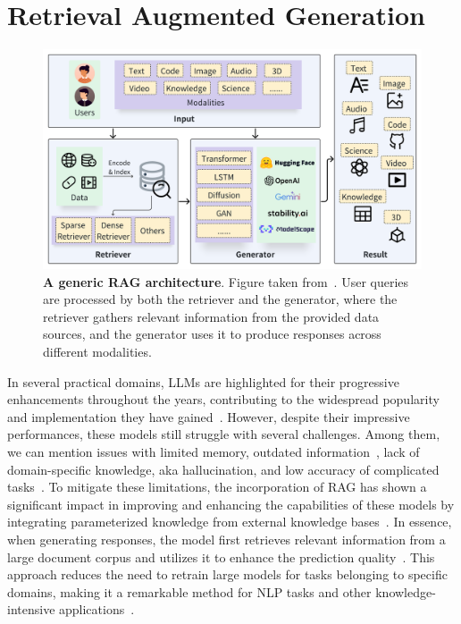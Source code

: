 \documentclass{DESSThesis}
\begin{document}
\section{Retrieval Augmented Generation}

\begin{figure}[htb!]
	\centering
	\includegraphics[width=1.0\linewidth]{img/Large Language Models and RAG/RAG_overview.pdf}
        \caption[A generic RAG architecture]{\textbf{A generic RAG architecture}. Figure taken from~\cite{zhao2024retrievalaugmentedgenerationaigeneratedcontent}. User queries are processed by both the retriever and the generator, where the retriever gathers relevant information from the provided data sources, and the generator uses it to produce responses across different modalities.}
	\label{fig:rag_overview}
\end{figure}

In several practical domains, LLMs are highlighted for their progressive enhancements throughout the years, contributing to the widespread popularity and implementation they have gained~\cite{rane2023contribution}. However, despite their impressive performances, these models still struggle with several challenges. Among them, we can mention issues with limited memory, outdated information~\cite{naveed2024comprehensiveoverviewlargelanguage}, lack of domain-specific knowledge, aka hallucination, and low accuracy of complicated tasks~\cite{gao2024retrievalaugmentedgenerationlargelanguage,liu2024raghelpreasoningllm,bartczak2024rag,wang2024evaluatingqualityanswersretrievalaugmented,10.14778/3685800.3685905,wang2024bioragragllmframeworkbiological}. To mitigate these limitations, the incorporation of RAG has shown a significant impact in improving and enhancing the capabilities of these models by integrating parameterized knowledge from external knowledge bases~\cite{naveed2024comprehensiveoverviewlargelanguage,gao2024retrievalaugmentedgenerationlargelanguage}. In essence, when generating responses, the model first retrieves relevant information from a large document corpus and utilizes it to enhance the prediction quality~\cite{gao2024retrievalaugmentedgenerationlargelanguage}. This approach reduces the need to retrain large models for tasks belonging to specific domains, making it a remarkable method for NLP tasks and other knowledge-intensive applications~\cite{10.1145/3626772.3657957}.
\end{document}
